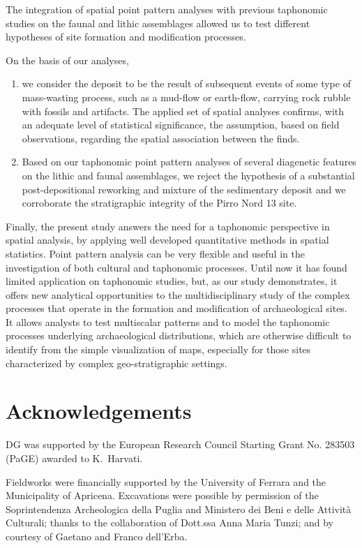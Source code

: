 \documentclass[5p,authoryear]{elsarticle} %
\begin{document}
The integration of spatial point pattern analyses with previous taphonomic studies on the faunal and lithic assemblages allowed us to test different hypotheses of site formation and modification processes.

On the basis of our analyses,
\begin{enumerate}
  \item we consider the deposit to be the result of subsequent events of some type of mass-wasting process, such as a mud-flow or earth-flow, carrying rock rubble with fossils and artifacts. The applied set of spatial analyses confirms, with an adequate level of statistical significance, the assumption, based on field observations, regarding the spatial association between the finds.
  \item Based on our taphonomic point pattern analyses of several diagenetic features on the lithic and faunal assemblages, we reject the hypothesis of a substantial post-depositional reworking and mixture of the sedimentary deposit and we corroborate the stratigraphic integrity of the Pirro Nord 13 site.
\end{enumerate}

Finally, the present study answers the need for a taphonomic perspective in spatial analysis, by applying well developed quantitative methods in spatial statistics. Point pattern analysis can be very flexible and useful in the investigation of both cultural and taphonomic processes. Until now it has found limited application on taphonomic studies, but, as our study demonstrates, it offers new analytical opportunities to the multidisciplinary study of the complex processes that operate in the formation and modification of archaeological sites. It allows analysts to test multiscalar patterns and to model the taphonomic processes underlying archaeological distributions, which are otherwise difficult to identify from the simple visualization of maps, especially for those sites characterized by complex geo-stratigraphic settings.

\section*{Acknowledgements}

DG was supported by the European Research Council Starting Grant No. 283503 (PaGE) awarded to K.~Harvati.

Fieldworks were financially supported by the University of Ferrara and the Municipality of Apricena. Excavations were possible by permission of the Soprintendenza Archeologica della Puglia and Ministero dei Beni e delle Attività Culturali; thanks to the collaboration of Dott.ssa Anna Maria Tunzi; and by courtesy of Gaetano and Franco dell'Erba.
\end{document}
